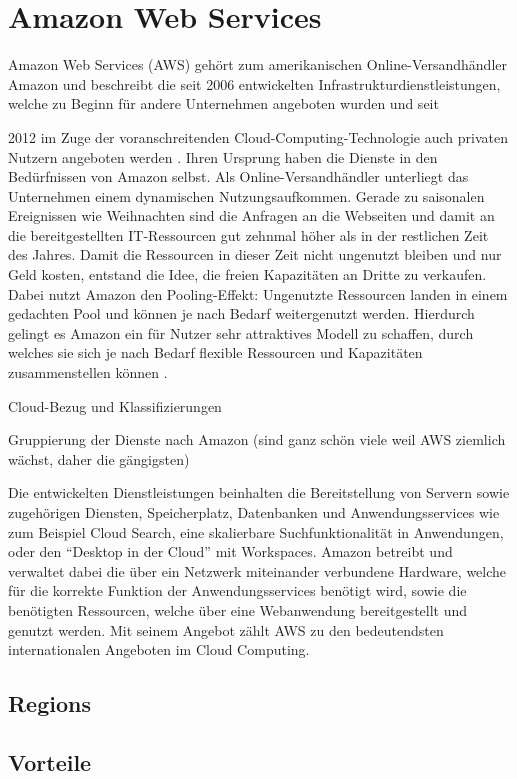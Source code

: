 \chapter{Amazon Web Services}\label{chapter:kapitellabel} %
Amazon Web Services (AWS) gehört zum amerikanischen Online-Versandhändler Amazon und beschreibt die
seit 2006 entwickelten Infrastrukturdienstleistungen, welche zu Beginn für andere Unternehmen angeboten
wurden und seit {{\color{red}2012 im Zuge der voranschreitenden Cloud-Computing-Technologie auch
privaten Nutzern angeboten werden} \cite{aws:general}. Ihren Ursprung haben die Dienste in den Bedürfnissen von Amazon selbst. Als Online-Versandhändler unterliegt das Unternehmen einem dynamischen
Nutzungsaufkommen. Gerade zu saisonalen Ereignissen wie Weihnachten sind die Anfragen
an die Webseiten und damit an die bereitgestellten IT-Ressourcen gut zehnmal höher als
in der restlichen Zeit des Jahres. Damit die Ressourcen in dieser Zeit nicht ungenutzt
bleiben und nur Geld kosten, entstand die Idee, die freien Kapazitäten an Dritte zu verkaufen.
Dabei nutzt Amazon den Pooling-Effekt: Ungenutzte Ressourcen landen in einem gedachten Pool und
können je nach Bedarf weitergenutzt werden. Hierdurch gelingt es Amazon ein für Nutzer
sehr attraktives Modell zu schaffen, durch welches sie sich je nach Bedarf flexible
Ressourcen und Kapazitäten zusammenstellen können \cite{baun:springer}.

Cloud-Bezug und Klassifizierungen

Gruppierung der Dienste nach Amazon (sind ganz schön viele weil AWS ziemlich wächst, daher die gängigsten)

Die entwickelten Dienstleistungen beinhalten die Bereitstellung von Servern sowie
zugehörigen Diensten, Speicherplatz, Datenbanken und Anwendungsservices wie zum
Beispiel Cloud Search, eine skalierbare Suchfunktionalität in Anwendungen, oder
den “Desktop in der Cloud” mit Workspaces. Amazon betreibt und verwaltet dabei
die über ein Netzwerk miteinander verbundene Hardware, welche für die korrekte
Funktion der Anwendungsservices benötigt wird, sowie die benötigten Ressourcen,
welche über eine Webanwendung bereitgestellt und genutzt werden. Mit seinem Angebot
zählt AWS zu den bedeutendsten internationalen Angeboten im Cloud Computing.

\section{Regions}
\section{Vorteile}
}
